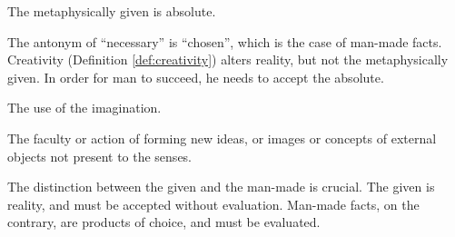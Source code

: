             \begin{corollary}
            \label{cor:given}
                The metaphysically given is absolute.
            \end{corollary}
            
        The antonym of ``necessary'' is ``chosen'', which is the case of man-made facts. Creativity (Definition \ref{def:creativity}) alters reality, but not the metaphysically given. In order for man to succeed, he needs to accept the absolute.

            \begin{definition}[Creativity]
            \label{def:creativity}
                The use of the imagination.
            \end{definition}

            \begin{definition}[Imagination]
                The faculty or action of forming new ideas, or images or concepts of external objects not present to the senses.
            \end{definition}
            
        The distinction between the given and the man-made is crucial. The given is reality, and must be accepted without evaluation. Man-made facts, on the contrary, are products of choice, and must be evaluated.